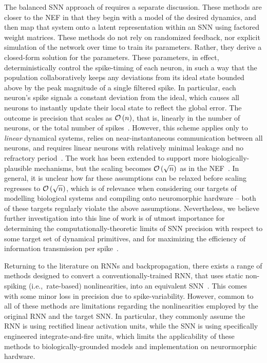 The balanced SNN approach of \citet{boerlin2011spike, boerlin2013predictive} requires a separate discussion.
These methods are closer to the NEF in that they begin with a model of the desired dynamics, and then map that system onto a latent representation within an SNN using factored weight matrices.
These methods do not rely on randomized feedback, nor explicit simulation of the network over time to train its parameters.
Rather, they derive a closed-form solution for the parameters.
These parameters, in effect, deterministically control the spike-timing of each neuron, in such a way that the population collaboratively keeps any deviations from its ideal state bounded above by the peak magnitude of a single filtered spike.
In particular, each neuron's spike signals a constant deviation from the ideal, which causes all neurons to instantly update their local state to reflect the global error.
The outcome is precision that scales as $\mathcal{O}\left({n}\right)$, that is, linearly in the number of neurons, or the total number of spikes~\citep{boahen2017neuromorph}. 
However, this scheme applies only to \emph{linear} dynamical systems, relies on near-instantaneous communication between all neurons, and requires linear neurons with relatively minimal leakage and no refractory period~\citep{boerlin2013predictive}.
The work has been extended to support more biologically-plausible mechanisms, but the scaling becomes $\mathcal{O}\left({\sqrt{n}}\right)$ as in the NEF~\citep[][Figure~12d]{schwemmer2015constructing}.
In general, it is unclear how far these assumptions can be relaxed before scaling regresses to $\mathcal{O}\left({\sqrt{n}}\right)$, which is of relevance when considering our targets of modelling biological systems and compiling onto neuromorphic hardware -- both of these targets regularly violate the above assumptions.
Nevertheless, we believe further investigation into this line of work is of utmost importance for determining the computationally-theoretic limits of SNN precision with respect to some target set of dynamical primitives, and for maximizing the efficiency of information transmission per spike~\citep[][pp.~92--127]{eliasmith2003a}.

Returning to the literature on RNNs and backpropagation, there exists a range of methods designed to convert a conventionally-trained RNN, that uses static non-spiking (i.e.,~rate-based) nonlinearities, into an equivalent SNN~\citep{rueckauer2017conversion, yousefzadehconversion2019}.
This comes with some minor loss in precision due to spike-variability.
However, common to all of these methods are limitations regarding the nonlinearities employed by the original RNN and the target SNN.
In particular, they commonly assume the RNN is using rectified linear activation units, while the SNN is using specifically engineered integrate-and-fire units, which limits the applicability of these methods to biologically-grounded models and implementation on neurormorphic hardware.

